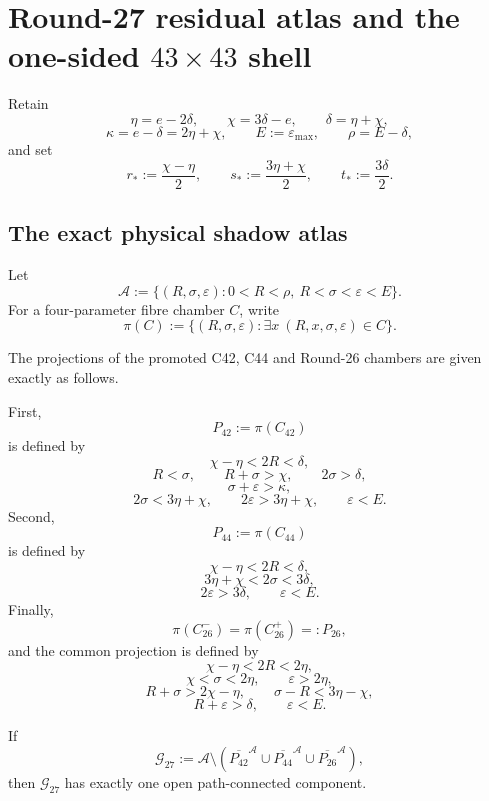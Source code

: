 \section{Round-27 residual atlas and the one-sided \texorpdfstring{$43\times43$}{43x43} shell}
\label{sec:p12-round27-residual-atlas}

Retain
\[
\eta=e-2\delta,
\qquad
\chi=3\delta-e,
\qquad
\delta=\eta+\chi,
\]
\[
\kappa=e-\delta=2\eta+\chi,
\qquad
E:=\varepsilon_{\max},
\qquad
\rho=E-\delta,
\]
and set
\[
r_*:=\frac{\chi-\eta}{2},
\qquad
s_*:=\frac{3\eta+\chi}{2},
\qquad
 t_*:=\frac{3\delta}{2}.
\]

\subsection{The exact physical shadow atlas}

Let
\[
\mathcal A
:=
\{(R,\sigma,\varepsilon):
0<R<\rho,\ R<\sigma<\varepsilon<E\}.
\]
For a four-parameter fibre chamber \(C\), write
\[
\pi(C)
:=
\{(R,\sigma,\varepsilon):
\exists x\ (R,x,\sigma,\varepsilon)\in C\}.
\]

\begin{theorem}
\label{thm:p12-round27-atlas}
The projections of the promoted C42, C44 and Round-26 chambers are given
exactly as follows.

First,
\[
P_{42}:=\pi(C_{42})
\]
is defined by
\[
\chi-\eta<2R<\delta,
\]
\[
R<\sigma,
\qquad
R+\sigma>\chi,
\qquad
2\sigma>\delta,
\]
\[
\sigma+\varepsilon>\kappa,
\]
\[
2\sigma<3\eta+\chi,
\qquad
2\varepsilon>3\eta+\chi,
\qquad
\varepsilon<E.
\]
Second,
\[
P_{44}:=\pi(C_{44})
\]
is defined by
\[
\chi-\eta<2R<\delta,
\]
\[
3\eta+\chi<2\sigma<3\delta,
\]
\[
2\varepsilon>3\delta,
\qquad
\varepsilon<E.
\]
Finally,
\[
\pi(C_{26}^{-})=\pi(C_{26}^{+})=:P_{26},
\]
and the common projection is defined by
\[
\chi-\eta<2R<2\eta,
\]
\[
\chi<\sigma<2\eta,
\qquad
\varepsilon>2\eta,
\]
\[
R+\sigma>2\chi-\eta,
\qquad
\sigma-R<3\eta-\chi,
\]
\[
R+\varepsilon>\delta,
\qquad
\varepsilon<E.
\]

If
\[
\mathcal G_{27}
:=
\mathcal A\setminus
\left(
\overline{P_{42}}^{\mathcal A}
\cup
\overline{P_{44}}^{\mathcal A}
\cup
\overline{P_{26}}^{\mathcal A}
\right),
\]
then \(\mathcal G_{27}\) has exactly one open path-connected component.
\end{theorem}

